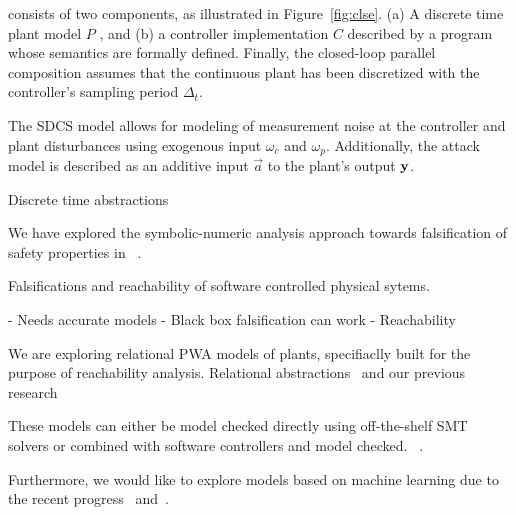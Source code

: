 
 consists of two
components, as illustrated in Figure~\ref{fig:clse}. (a) A discrete
time plant model $P$ , and (b) a controller implementation $C$
described by a program whose semantics are formally defined.  Finally,
the closed-loop parallel composition assumes that the continuous plant
has been discretized with the controller's sampling period $\Delta_t$.

The SDCS model allows for modeling of measurement noise at the
controller and plant disturbances using exogenous input $\omega_c$ and
$\omega_p$. Additionally, the attack model is described as an
additive input $\vec{a}$ to the plant's output $\mathbf{y}$.

Discrete time abstractions

We have explored the symbolic-numeric analysis approach towards
falsification of safety properties in ~\cite{}.

Falsifications and reachability of software controlled physical sytems.

- Needs accurate models
- Black box falsification can work
- Reachability




We are exploring relational PWA models of plants,
specifiaclly built for the purpose of reachability analysis.
Relational abstractions~\cite{Tiwari2012} and our previous
research~\cite{zutshi2012timed}

These
models can either be model checked directly using off-the-shelf SMT
solvers or combined with software controllers and model checked.
~\cite{Zutshi2016}.

Furthermore, we would like to explore models based on machine learning
due to the recent progress~\cite{pulina2012challenging,
pulina2011never, pulina2011checking} and~\cite{katz2017reluplex}.


